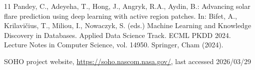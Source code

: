 \documentclass[runningheads]{llncs}
\begin{document}
\begin{thebibliography}{11}
Pandey, C., Adeyeha, T., Hong, J., Angryk, R.A., Aydin, B.: Advancing solar flare prediction using deep learning with active region patches. In: Bifet, A., Krilavi\v{c}ius, T., Miliou, I., Nowaczyk, S. (eds.) Machine Learning and Knowledge Discovery in Databases. Applied Data Science Track. ECML PKDD 2024. Lecture Notes in Computer Science, vol. 14950. Springer, Cham (2024). 


SOHO project website, \url{https://soho.nascom.nasa.gov/}, last accessed 2026/03/29

\end{thebibliography}
\end{document}
